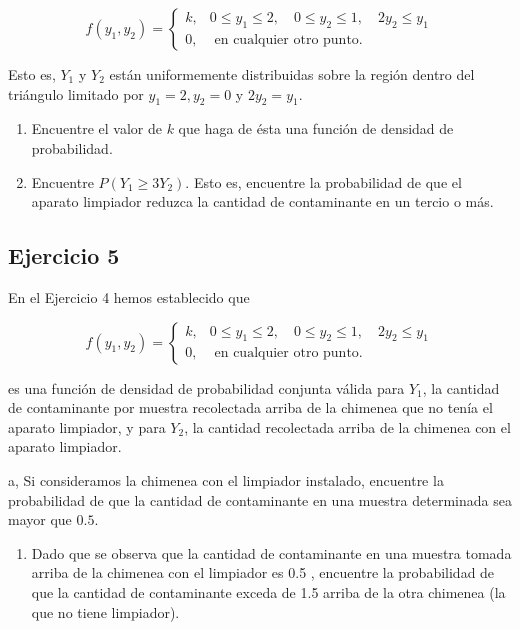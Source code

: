 \documentclass[
]{article}
\providecommand{\tightlist}{%
  \setlength{\itemsep}{0pt}\setlength{\parskip}{0pt}}
\begin{document}
\[
f\left(y_{1}, y_{2}\right)= \begin{cases}k, & 0 \leq y_{1} \leq 2,\quad 0 \leq y_{2} \leq 1, \quad 2 y_{2} \leq y_{1} \\ 0, & \text { en cualquier otro punto. }\end{cases}
\]

Esto es, \(Y_{1}\) y \(Y_{2}\) están uniformemente distribuidas sobre la región dentro del triángulo limitado por \(y_{1}=2, y_{2}=0\) y \(2 y_{2}=y_{1}\).

\begin{enumerate}
\def\labelenumi{\alph{enumi}.}
\item
  Encuentre el valor de \(k\) que haga de ésta una función de densidad de probabilidad.
\item
  Encuentre \(P\left(Y_{1} \geq 3 Y_{2}\right)\). Esto es, encuentre la probabilidad de que el aparato limpiador reduzca la cantidad de contaminante en un tercio o más.
\end{enumerate}

\subsection{Ejercicio 5}\label{ejercicio-5}

En el Ejercicio 4 hemos establecido que

\[
f\left(y_{1}, y_{2}\right)= \begin{cases}k, & 0 \leq y_{1} \leq 2,\quad 0 \leq y_{2} \leq 1, \quad 2 y_{2} \leq y_{1} \\ 0, & \text { en cualquier otro punto. }\end{cases}
\]

es una función de densidad de probabilidad conjunta válida para \(Y_{1}\), la cantidad de contaminante por muestra recolectada arriba de la chimenea que no tenía el aparato limpiador, y para \(Y_{2}\), la cantidad recolectada arriba de la chimenea con el aparato limpiador.

a, Si consideramos la chimenea con el limpiador instalado, encuentre la probabilidad de que la cantidad de contaminante en una muestra determinada sea mayor que \(0.5\).

\begin{enumerate}
\def\labelenumi{\alph{enumi}.}
\setcounter{enumi}{1}
\tightlist
\item
  Dado que se observa que la cantidad de contaminante en una muestra tomada arriba de la chimenea con el limpiador es 0.5 , encuentre la probabilidad de que la cantidad de contaminante exceda de 1.5 arriba de la otra chimenea (la que no tiene limpiador).
\end{enumerate}
\end{document}
